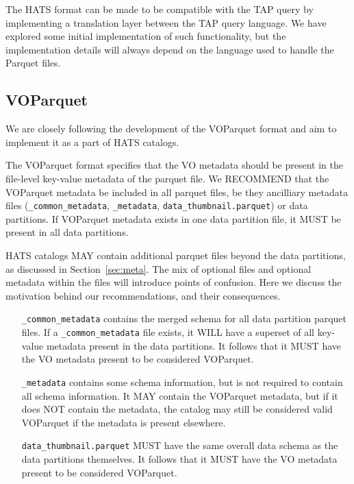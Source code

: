 \documentclass[11pt,a4paper]{ivoa}
\begin{document}
The HATS format can be made to be compatible with the TAP query \citep{IVOA:TAP} by implementing a translation layer between the TAP query language. 
We have explored some initial implementation of such functionality, but the implementation details will always depend on the language used to handle the Parquet files. \par

\subsection{VOParquet}

We are closely following the development of the VOParquet \citep{IVOAPARQUET} format and aim to implement it as a part of HATS catalogs.

The VOParquet format specifies that the VO metadata should be present in the file-level key-value metadata of the parquet file.
We RECOMMEND that the VOParquet metadata be included in all parquet files, be they ancilliary metadata files (\texttt{\_common\_metadata}, \texttt{\_metadata}, \texttt{data\_thumbnail.parquet}) or data partitions.
If VOParquet metadata exists in one data partition file, it MUST be present in all data partitions.

HATS catalogs MAY contain additional parquet files beyond the data partitions, as discussed in Section~\ref{sec:meta}. 
The mix of optional files and optional metadata within the files will introduce points of confusion. 
Here we discuss the motivation behind our recommendations, and their consequences.\par

\begin{itemize}
  \item[\texttt{\_common\_metadata}] contains the merged schema for all data partition parquet files.
  If a \texttt{\_common\_metadata} file exists, it WILL have a superset of all key-value metadata present in the data partitions. 
  It follows that it MUST have the VO metadata present to be considered VOParquet.
  \item[\texttt{\_metadata}] contains some schema information, but is not required to contain all schema information.
  It MAY contain the VOParquet metadata, but if it does NOT contain the metadata, the catalog may still be considered valid VOParquet if the metadata is present elsewhere.
  \item[\texttt{data\_thumbnail.parquet}] MUST have the same overall data schema as the data partitions themselves.
  It follows that it MUST have the VO metadata present to be considered VOParquet.
\end{itemize}
\end{document}
